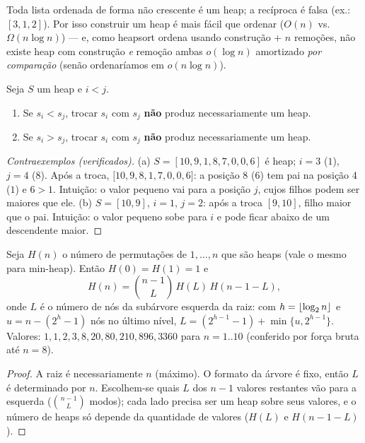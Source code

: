 \begin{prop}
Toda lista ordenada de forma não crescente é um heap; a recíproca é falsa (ex.: $[3,1,2]$). Por isso construir um heap é mais fácil que ordenar ($O(n)$ vs.\ $\Omega(n\log n)$) --- e, como heapsort ordena usando construção + $n$ remoções, não existe heap com construção \emph{e} remoção ambas $o(\log n)$ amortizado \emph{por comparação} (senão ordenaríamos em $o(n\log n)$).
\end{prop}

\begin{prop}
Seja $S$ um heap e $i<j$.
\begin{enumerate}[label=(\alph*)]
  \item Se $s_i<s_j$, trocar $s_i$ com $s_j$ \textbf{não} produz necessariamente um heap.
  \item Se $s_i>s_j$, trocar $s_i$ com $s_j$ \textbf{não} produz necessariamente um heap.
\end{enumerate}
\end{prop}
\begin{proof}[Contraexemplos (verificados)]
(a) $S=[10,9,1,8,7,0,0,6]$ é heap; $i=3$ ($1$), $j=4$ ($8$). Após a troca, $[10,9,8,1,$\allowbreak$7,0,0,6]$: a posição 8 ($6$) tem pai na posição 4 ($1$) e $6>1$. Intuição: o valor pequeno vai para a posição $j$, cujos filhos podem ser maiores que ele.
(b) $S=[10,9]$, $i=1$, $j=2$: após a troca $[9,10]$, filho maior que o pai. Intuição: o valor pequeno sobe para $i$ e pode ficar abaixo de um descendente maior.
\end{proof}

\begin{prop}
Seja $H(n)$ o número de permutações de $1,\dots,n$ que são heaps (vale o mesmo para min-heap). Então $H(0)=H(1)=1$ e
\[
H(n)=\binom{n-1}{L}\,H(L)\,H(n-1-L),
\]
onde $L$ é o número de nós da subárvore esquerda da raiz: com $h=\lfloor\log_2 n\rfloor$ e $u=n-(2^h-1)$ nós no último nível, $L=(2^{h-1}-1)+\min\{u,2^{h-1}\}$. Valores: $1,1,2,3,8,20,80,210,896,3360$ para $n=1..10$ (conferido por força bruta até $n=8$).
\end{prop}
\begin{proof}
A raiz é necessariamente $n$ (máximo). O formato da árvore é fixo, então $L$ é determinado por $n$. Escolhem-se quais $L$ dos $n-1$ valores restantes vão para a esquerda ($\binom{n-1}{L}$ modos); cada lado precisa ser um heap sobre seus valores, e o número de heaps só depende da quantidade de valores ($H(L)$ e $H(n-1-L)$).
\end{proof}

